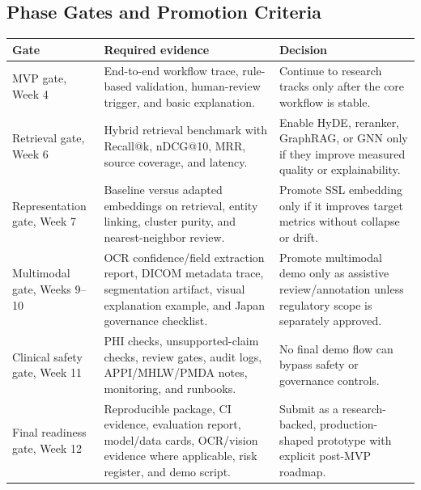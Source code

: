 \subsection{Phase Gates and Promotion Criteria}

\begin{longtable}{p{}p{}p{}}
\toprule
\textbf{Gate} & \textbf{Required evidence} & \textbf{Decision} \\
\midrule
MVP gate, Week 4 & End-to-end workflow trace, rule-based validation, human-review trigger, and basic explanation. & Continue to research tracks only after the core workflow is stable. \\
\addlinespace
Retrieval gate, Week 6 & Hybrid retrieval benchmark with Recall@k, nDCG@10, MRR, source coverage, and latency. & Enable HyDE, reranker, GraphRAG, or GNN only if they improve measured quality or explainability. \\
\addlinespace
Representation gate, Week 7 & Baseline versus adapted embeddings on retrieval, entity linking, cluster purity, and nearest-neighbor review. & Promote SSL embedding only if it improves target metrics without collapse or drift. \\
\addlinespace
Multimodal gate, Weeks 9--10 & OCR confidence/field extraction report, DICOM metadata trace, segmentation artifact, visual explanation example, and Japan governance checklist. & Promote multimodal demo only as assistive review/annotation unless regulatory scope is separately approved. \\
\addlinespace
Clinical safety gate, Week 11 & PHI checks, unsupported-claim checks, review gates, audit logs, APPI/MHLW/PMDA notes, monitoring, and runbooks. & No final demo flow can bypass safety or governance controls. \\
\addlinespace
Final readiness gate, Week 12 & Reproducible package, CI evidence, evaluation report, model/data cards, OCR/vision evidence where applicable, risk register, and demo script. & Submit as a research-backed, production-shaped prototype with explicit post-MVP roadmap. \\
\bottomrule
\end{longtable}
